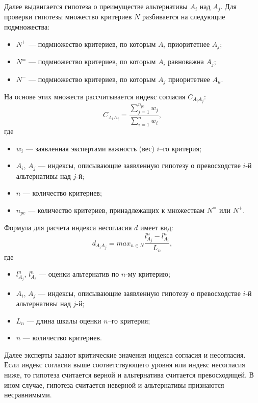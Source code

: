Далее выдвигается гипотеза о преимуществе альтернативы $A_i$ над $A_j$.
Для проверки гипотезы множество критериев $N$ разбивается на следующие подмножества: 
\begin{itemize} 
	\item $N^+$ --- подмножество критериев, по которым $A_i$ приоритетнее $A_j$; 
	\item $N^=$ --- подмножество критериев, по которым $A_i$ равноважна $A_j$; 
	\item $N^-$ --- подмножество критериев, по которым $A_j$ приоритетнее $A_u$.
\end{itemize}

На основе этих множеств рассчитывается индекс согласия $C_{{A_i}{A_j}}$:
\begin{equation}
	C_{{A_i}{A_j}} = \frac{\sum_{j=1} ^{n_{pe}} w_j}{\sum_{i=1} ^{n} {w_i}},
	\label{eq:electre_C}
\end{equation}
где
\begin{itemize}
	\item $w_i$ --- заявленная экспертами важность (вес) $i$--го критерия;
	\item $A_i$, $A_j$ --- индексы, описывающие заявленную гипотезу о превосходстве $i$-й альтернативы над $j$-й;
	\item $n$ --- количество критериев; 
	\item $n_{pe}$ --- количество критериев, принадлежащих к множествам $N^=$ или $N^+$.
\end{itemize}

Формула для расчета индекса несогласия $d$ имеет вид:
\begin{equation}
	d_{{A_i}{A_j}} = {max}_{n \in N} \frac{l^n_{A_j} - l^n_{A_i}}{{L_n}},
	\label{eq:electre_d}
\end{equation}
где
\begin{itemize}
	\item $l^n_{A_j}$, $l^n_{A_i}$ --- оценки альтернатив по $n$-му критерию;
	\item $A_i$, $A_j$ --- индексы, описывающие заявленную гипотезу о превосходстве $i$-й альтернативы над $j$-й;
	\item $L_n$ --- длина шкалы оценки $n$--го критерия;
	\item $n$ --- количество критериев.
\end{itemize}

Далее эксперты задают критические значения индекса согласия и несогласия.
Если индекс согласия выше соответствующего уровня или индекс несогласия ниже, то гипотеза считается верной и альтернатива считается превосходящей.
В ином случае, гипотеза считается неверной и альтернативы признаются несравнимыми.

